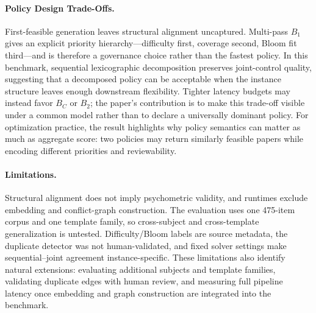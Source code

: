\documentclass[runningheads]{llncs}
\begin{document}
\paragraph{Policy Design Trade-Offs.} First-feasible generation leaves structural alignment uncaptured. Multi-pass $B_1$ gives an explicit priority hierarchy---difficulty first, coverage second, Bloom fit third---and is therefore a governance choice rather than the fastest policy. In this benchmark, sequential lexicographic decomposition preserves joint-control quality, suggesting that a decomposed policy can be acceptable when the instance structure leaves enough downstream flexibility. Tighter latency budgets may instead favor $B_C$ or $B_2$; the paper's contribution is to make this trade-off visible under a common model rather than to declare a universally dominant policy. For optimization practice, the result highlights why policy semantics can matter as much as aggregate score: two policies may return similarly feasible papers while encoding different priorities and reviewability.
\paragraph{Limitations.} Structural alignment does not imply psychometric validity, and runtimes exclude embedding and conflict-graph construction. The evaluation uses one 475-item corpus and one template family, so cross-subject and cross-template generalization is untested. Difficulty/Bloom labels are source metadata, the duplicate detector was not human-validated, and fixed solver settings make sequential--joint agreement instance-specific.
These limitations also identify natural extensions: evaluating additional subjects and template families, validating duplicate edges with human review, and measuring full pipeline latency once embedding and graph construction are integrated into the benchmark.
\end{document}
